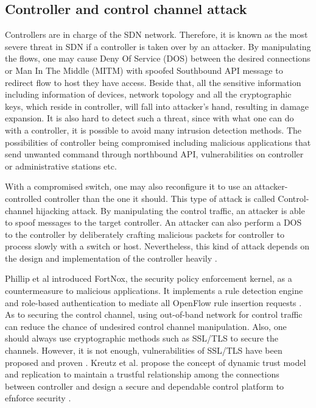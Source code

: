 \subsection{Controller and control channel attack}
Controllers are in charge of the SDN network. Therefore, it is known as the most severe threat in SDN if a controller is taken over by an attacker. By manipulating the flows, one may cause Deny Of Service (DOS) between the desired connections or Man In The Middle (MITM) with spoofed Southbound API message to redirect flow to host they have access. Beside that, all the sensitive information including information of devices, network topology and all the cryptographic keys, which reside in controller, will fall into attacker's hand, resulting in damage expansion. It is also hard to detect such a threat, since with what one can do with a controller, it is possible to avoid many intrusion detection methods. The possibilities of controller being compromised including malicious applications that send unwanted command through northbound API, vulnerabilities on controller or administrative stations etc.

With a compromised switch, one may also reconfigure it to use an attacker-controlled controller than the one it should. This type of attack is called Control-channel hijacking attack. By manipulating the control traffic, an attacker is able to spoof messages to the target controller. An attacker can also perform a DOS to the controller by deliberately crafting malicious packets for controller to process slowly with a switch or host. Nevertheless, this kind of attack depends on the design and implementation of the controller heavily \cite{AAS14}.

Phillip et al introduced FortNox, the security policy enforcement kernel, as a countermeasure to malicious applications. It implements a rule detection engine and role-based authentication to mediate all OpenFlow rule insertion requests \cite{PSYFTG12}. As to securing the control channel, using out-of-band network for control traffic can reduce the chance of undesired control channel manipulation. Also, one should always use cryptographic methods such as SSL/TLS to secure the channels. However, it is not enough, vulnerabilities of SSL/TLS have been proposed and proven \cite{HRKC12}. Kreutz et al. propose the concept of dynamic trust model and replication to maintain a trustful relationship among the connections between controller and design a secure and dependable control platform to efnforce security \cite{KDFRV13}. 

